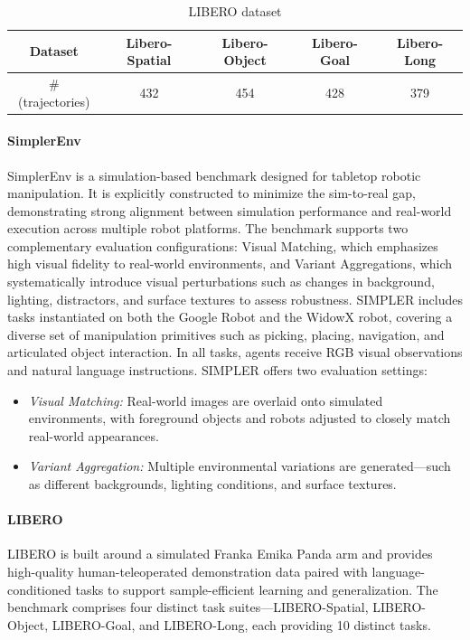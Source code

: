 \begin{table}[htbp]
    \caption{LIBERO dataset}
    \label{tab:libero-data}
    \centering
    \begin{tabular}{c|cccc}
    \toprule
         Dataset & Libero-Spatial & Libero-Object & Libero-Goal & Libero-Long \\
    \midrule
       \#(trajectories) & 432 & 454 & 428 & 379 \\
    \bottomrule
    \end{tabular}

\end{table}

\paragraph{SimplerEnv} SimplerEnv \cite{li2024evaluating} is a simulation-based benchmark designed for tabletop robotic manipulation. It is explicitly constructed to minimize the sim-to-real gap, demonstrating strong alignment between simulation performance and real-world execution across multiple robot platforms. The benchmark supports two complementary evaluation configurations: Visual Matching, which emphasizes high visual fidelity to real-world environments, and Variant Aggregations, which systematically introduce visual perturbations such as changes in background, lighting, distractors, and surface textures to assess robustness. SIMPLER includes tasks instantiated on both the Google Robot and the WidowX robot, covering a diverse set of manipulation primitives such as picking, placing, navigation, and articulated object interaction. In all tasks, agents receive RGB visual observations and natural language instructions. SIMPLER offers two evaluation settings:
\begin{itemize}[noitemsep,topsep=0pt,leftmargin=*]
    \item \emph{Visual Matching:} Real-world images are overlaid onto simulated environments, with foreground objects and robots adjusted to closely match real-world appearances.
    \item \emph{Variant Aggregation:} Multiple environmental variations are generated—such as different backgrounds, lighting conditions, and surface textures.
\end{itemize}

\paragraph{LIBERO} LIBERO is built around a simulated Franka Emika Panda arm and provides high-quality human-teleoperated demonstration data paired with language-conditioned tasks to support sample-efficient learning and generalization. The benchmark comprises four distinct task suites—LIBERO-Spatial, LIBERO-Object, LIBERO-Goal, and LIBERO-Long, each providing 10 distinct tasks.


